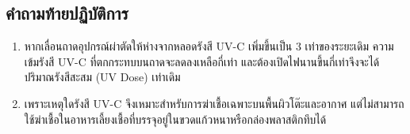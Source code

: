 \subsection{คำถามท้ายปฏิบัติการ}
\begin{enumerate}
    \item หากเลื่อนถาดอุปกรณ์ผ่าตัดให้ห่างจากหลอดรังสี UV-C เพิ่มขึ้นเป็น $3$ เท่าของระยะเดิม ความเข้มรังสี UV-C ที่ตกกระทบบนถาดจะลดลงเหลือกี่เท่า และต้องเปิดไฟนานขึ้นกี่เท่าจึงจะได้ปริมาณรังสีสะสม (UV Dose) เท่าเดิม
    \item เพราะเหตุใดรังสี UV-C จึงเหมาะสำหรับการฆ่าเชื้อเฉพาะบนพื้นผิวโต๊ะและอากาศ แต่ไม่สามารถใช้ฆ่าเชื้อในอาหารเลี้ยงเชื้อที่บรรจุอยู่ในขวดแก้วหนาหรือกล่องพลาสติกทึบได้
\end{enumerate}
